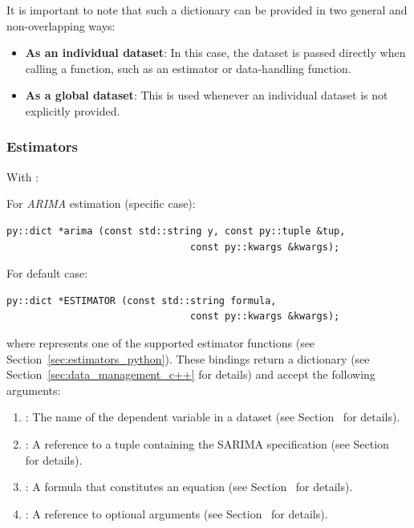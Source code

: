 It is important to note that such a dictionary can be
provided in two general and non-overlapping ways:
\begin{itemize}
	\item \textbf{As an individual dataset}: In this case,
		the dataset is passed directly when calling a \gretlpy
		function, such as an estimator or data-handling function.
	\item \textbf{As a global dataset}: This is used whenever
		an individual dataset is not explicitly provided.
\end{itemize}

\subsubsection{Estimators}\label{sec:estimators_c++}
With :
%

For \textit{ARIMA} estimation (specific case):
\begin{lstlisting}[style=cppstyle]
py::dict *arima (const std::string y, const py::tuple &tup,
								const py::kwargs &kwargs);
\end{lstlisting}

For default case:
\begin{lstlisting}[style=cppstyle]
py::dict *ESTIMATOR (const std::string formula,
								const py::kwargs &kwargs);
\end{lstlisting}
where  represents one of the supported
estimator functions (see Section~\ref{sec:estimators_python}).
These bindings return a \python dictionary (see
Section~\ref{sec:data_management_c++} for details) and accept
the following arguments:
\begin{enumerate}
	\item {}: The name of the dependent
		variable in a dataset (see Section~ for details).
	\item {}: A reference to a \python
		tuple containing the SARIMA specification (see Section~ for details).
	\item {}: A formula that constitutes
		an equation (see Section~ for details).
	\item {}: A reference to optional
		arguments (see Section~ for details).
\end{enumerate}
